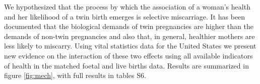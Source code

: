\documentclass[11pt]{article}
\begin{document}
We hypothesized that the process by which the association of a woman's health and her likelihood of a twin birth emerges is selective miscarriage. It has been documented that the biological demands of twin pregnancies are higher than the demands of non-twin pregnancies\cite{Shinagawaetal2005,Kahnetal2003} and also that, in general, healthier mothers are less likely to miscarry\cite{Garciaetal2002}. Using vital statistics data for the United States we present new evidence on the interaction of these two effects using all available indicators of health in the matched foetal and live births data.
Results are summarized in figure \ref{fig:mech}, with full results in tables S6. 
\end{document}
